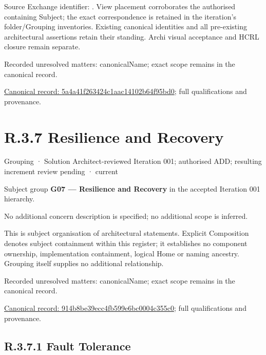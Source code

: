 Source Exchange identifier: \texttt{}. View placement corroborates
the authorised containing Subject; the exact correspondence is retained in the
iteration's folder/Grouping inventories. Existing canonical identities and all
pre-existing architectural assertions retain their standing. Archi visual
acceptance and HCRL closure remain separate.


{\small Recorded unresolved matters: canonicalName; exact scope remains in the canonical record.}\par
{\footnotesize \href{../../../../continuum/grouping/5a4a41f263424c1aac14102b64f95bd0.md}{Canonical record: 5a4a41f263424c1aac14102b64f95bd0}; full qualifications and provenance.}\par
\section*{R.3.7 Resilience and Recovery}
\label{navigation:R.3.7}

\label{element:914b8be39ecc4fb599e6bc0004c355c0}
{\small Grouping · Solution Architect-reviewed Iteration 001; authorised ADD; resulting increment review pending · current}\par

Subject group \textbf{G07 — Resilience and Recovery} in the accepted Iteration 001 hierarchy.



No additional concern description is specified; no additional scope is inferred.



This is subject organisation of architectural statements. Explicit Composition denotes subject containment within this register; it establishes no component ownership, implementation containment, logical Home or naming ancestry. Grouping itself supplies no additional relationship.


{\small Recorded unresolved matters: canonicalName; exact scope remains in the canonical record.}\par
{\footnotesize \href{../../../../continuum/grouping/914b8be39ecc4fb599e6bc0004c355c0.md}{Canonical record: 914b8be39ecc4fb599e6bc0004c355c0}; full qualifications and provenance.}\par
\subsection*{R.3.7.1 Fault Tolerance}
\label{navigation:R.3.7.1}

